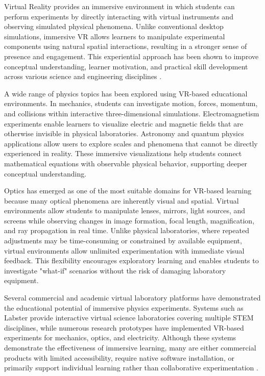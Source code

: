 Virtual Reality provides an immersive environment in which students can perform experiments by directly interacting with virtual instruments and observing simulated physical phenomena. Unlike conventional desktop simulations, immersive VR allows learners to manipulate experimental components using natural spatial interactions, resulting in a stronger sense of presence and engagement. This experiential approach has been shown to improve conceptual understanding, learner motivation, and practical skill development across various science and engineering disciplines \cite{makransky2019adding}.

A wide range of physics topics has been explored using VR-based educational environments. In mechanics, students can investigate motion, forces, momentum, and collisions within interactive three-dimensional simulations. Electromagnetism experiments enable learners to visualize electric and magnetic fields that are otherwise invisible in physical laboratories. Astronomy and quantum physics applications allow users to explore scales and phenomena that cannot be directly experienced in reality. These immersive visualizations help students connect mathematical equations with observable physical behavior, supporting deeper conceptual understanding.

Optics has emerged as one of the most suitable domains for VR-based learning because many optical phenomena are inherently visual and spatial. Virtual environments allow students to manipulate lenses, mirrors, light sources, and screens while observing changes in image formation, focal length, magnification, and ray propagation in real time. Unlike physical laboratories, where repeated adjustments may be time-consuming or constrained by available equipment, virtual environments allow unlimited experimentation with immediate visual feedback. This flexibility encourages exploratory learning and enables students to investigate "what-if" scenarios without the risk of damaging laboratory equipment.

Several commercial and academic virtual laboratory platforms have demonstrated the educational potential of immersive physics experiments. Systems such as Labster provide interactive virtual science laboratories covering multiple STEM disciplines, while numerous research prototypes have implemented VR-based experiments for mechanics, optics, and electricity. Although these systems demonstrate the effectiveness of immersive learning, many are either commercial products with limited accessibility, require native software installation, or primarily support individual learning rather than collaborative experimentation \cite{labster, radianti2020review}.


